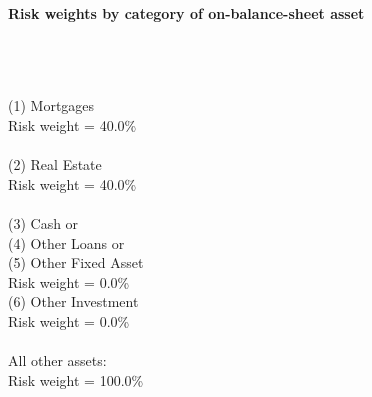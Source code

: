 \documentclass{article}
\begin{document}
\setlength{\parindent}{0em}
\begin{center}{\bf Risk weights by category of on-balance-sheet asset}\end{center}
~\\
~\\

~\\
(1) Mortgages \\
Risk weight = 40.0\%\\

~\\
(2) Real Estate\\
Risk weight = 40.0\%\\

~\\
(3) Cash or \\
(4) Other Loans or \\
(5) Other Fixed Asset\\
Risk weight = 0.0\%\\

(6) Other Investment\\
Risk weight = 0.0\%\\

~\\
All other assets:\\
Risk weight = 100.0\%\\

~\\
\end{document}
